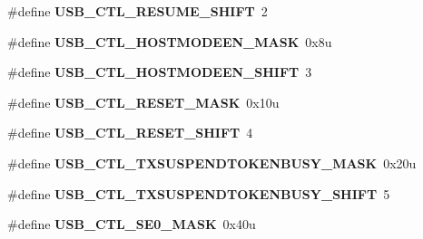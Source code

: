 \begin{DoxyCompactItemize}
\item 
\#define {\bfseries U\+S\+B\+\_\+\+C\+T\+L\+\_\+\+R\+E\+S\+U\+M\+E\+\_\+\+S\+H\+I\+FT}~2\hypertarget{group__USB__Register__Masks_gab8354dafb3b0cb438770fe60ffec4714}{}\label{group__USB__Register__Masks_gab8354dafb3b0cb438770fe60ffec4714}

\item 
\#define {\bfseries U\+S\+B\+\_\+\+C\+T\+L\+\_\+\+H\+O\+S\+T\+M\+O\+D\+E\+E\+N\+\_\+\+M\+A\+SK}~0x8u\hypertarget{group__USB__Register__Masks_gaddf09c4e93070675c5c93c711518250c}{}\label{group__USB__Register__Masks_gaddf09c4e93070675c5c93c711518250c}

\item 
\#define {\bfseries U\+S\+B\+\_\+\+C\+T\+L\+\_\+\+H\+O\+S\+T\+M\+O\+D\+E\+E\+N\+\_\+\+S\+H\+I\+FT}~3\hypertarget{group__USB__Register__Masks_ga87a32a06006794e2dd638fd2bb2eb788}{}\label{group__USB__Register__Masks_ga87a32a06006794e2dd638fd2bb2eb788}

\item 
\#define {\bfseries U\+S\+B\+\_\+\+C\+T\+L\+\_\+\+R\+E\+S\+E\+T\+\_\+\+M\+A\+SK}~0x10u\hypertarget{group__USB__Register__Masks_ga6e3734900ace59f3dedf7a8f246721d7}{}\label{group__USB__Register__Masks_ga6e3734900ace59f3dedf7a8f246721d7}

\item 
\#define {\bfseries U\+S\+B\+\_\+\+C\+T\+L\+\_\+\+R\+E\+S\+E\+T\+\_\+\+S\+H\+I\+FT}~4\hypertarget{group__USB__Register__Masks_gac709cb60252fd6ab2775785ffc2953e6}{}\label{group__USB__Register__Masks_gac709cb60252fd6ab2775785ffc2953e6}

\item 
\#define {\bfseries U\+S\+B\+\_\+\+C\+T\+L\+\_\+\+T\+X\+S\+U\+S\+P\+E\+N\+D\+T\+O\+K\+E\+N\+B\+U\+S\+Y\+\_\+\+M\+A\+SK}~0x20u\hypertarget{group__USB__Register__Masks_gaa2e78edccdce1268888d45bc4d81cfe1}{}\label{group__USB__Register__Masks_gaa2e78edccdce1268888d45bc4d81cfe1}

\item 
\#define {\bfseries U\+S\+B\+\_\+\+C\+T\+L\+\_\+\+T\+X\+S\+U\+S\+P\+E\+N\+D\+T\+O\+K\+E\+N\+B\+U\+S\+Y\+\_\+\+S\+H\+I\+FT}~5\hypertarget{group__USB__Register__Masks_gac6b9a4253ee9f3740d0c7b2692a44e8e}{}\label{group__USB__Register__Masks_gac6b9a4253ee9f3740d0c7b2692a44e8e}

\item 
\#define {\bfseries U\+S\+B\+\_\+\+C\+T\+L\+\_\+\+S\+E0\+\_\+\+M\+A\+SK}~0x40u\hypertarget{group__USB__Register__Masks_gac4c2c3ef09a72faaab7151297e8dfbe7}{}\label{group__USB__Register__Masks_gac4c2c3ef09a72faaab7151297e8dfbe7}


\end{DoxyCompactItemize}
